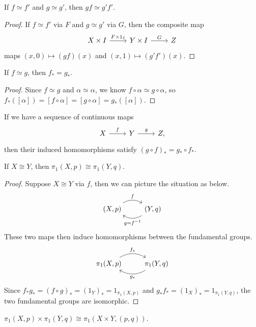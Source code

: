 \documentclass[twoside,10pt]{report}
\begin{document}
\begin{prop}
If $f \simeq f'$ and $g \simeq g'$, then $gf \simeq g'f'$.
\end{prop}
\begin{proof}
If $f \simeq f'$ via $F$ and $g \simeq g'$ via $G$, then the composite map
\[
\begin{tikzcd}
	X\times I\rar{F\times 1_{I}} & Y\times I \rar{G} & Z
\end{tikzcd}
\] 
maps $(x,0) \mapsto (gf)(x)$ and $(x,1)\mapsto (g'f')(x)$.
\end{proof}

\begin{cor}
If $f \simeq g$, then $f_{*}=g_{*}$.
\end{cor}
\begin{proof}
	Since $f \simeq g$ and $\alpha \simeq \alpha$, we know $f\circ \alpha \simeq g\circ \alpha$, so $f_{*}([\alpha]) = [f\circ \alpha] = [g\circ \alpha]=g_{*}([\alpha])$.
\end{proof}

\begin{prop}
If we have a sequence of continuous maps
\[
	\begin{tikzcd}
		X\rar{f}&Y\rar{g}&Z,
	\end{tikzcd}
\] 
then their induced homomorphisms satisfy $(g\circ f)_{*}=g_{*}\circ f_{*}$.
\end{prop}

\begin{thrm}[]
	If $X \cong Y$, then $\pi_1(X,p) \cong \pi_1(Y,q)$.
\end{thrm}
\begin{proof}
	Suppose $X \cong Y$ via $f$, then we can picture the situation as below.
	\[
	\begin{tikzcd}
		(X,p)\arrow[r,"f",bend left]&(Y,q)\arrow[l,"g=f^{-1}",bend left]
	\end{tikzcd}
	\] 
	These two maps then induce homomorphisms between the fundamental groups.
	\[
        \begin{tikzcd}
                \pi_1(X,p)\arrow[r,"f_{*}",bend left]&\pi_1(Y,q)\arrow[l,"g_{*}",bend left]
        \end{tikzcd}
        \]
	Since $f_{*}g_{*}=(f\circ g)_{*}=(1_{Y})_{*}=1_{\pi_1(X,p)}$ and $g_{*}f_{*}=(1_{X})_{*}=1_{\pi_1(Y,q)}$, the two fundamental groups are isomorphic.
\end{proof}

\begin{prop}
	$\pi_1(X,p) \times \pi_1(Y,q) \cong \pi_1(X\times Y,(p,q))$.
\end{prop}
\end{document}
